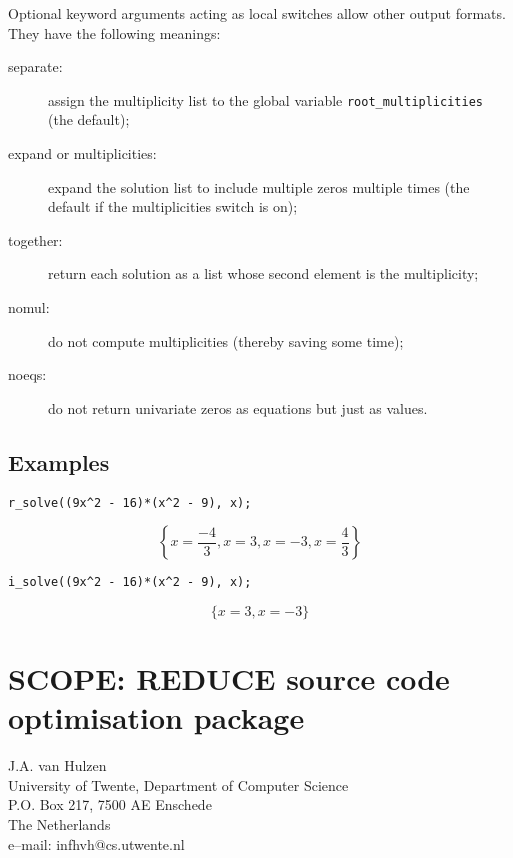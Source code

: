 \documentclass[11pt,letterpaper]{book}
\begin{document}
\begin{sloppypar}
Optional keyword arguments acting as local switches allow other output
formats.  They have the following meanings:
\begin{description}
\item[{\ttfamily separate}:] assign the multiplicity list to the global
  variable \verb|root_multiplicities| (the default);
\item[{\ttfamily expand} or {\ttfamily multiplicities}:] expand the solution
  list to include multiple zeros multiple times (the default if the
  {\ttfamily multiplicities} switch is on);
\item[{\ttfamily together}:] return each solution as a list whose second
  element is the multiplicity;
\item[{\ttfamily nomul}:] do not compute multiplicities (thereby saving
  some time);
\item[{\ttfamily noeqs}:] do not return univariate zeros as equations but
  just as values.
\end{description}
\end{sloppypar}


\section{Examples}

{\small\begin{verbatim}
r_solve((9x^2 - 16)*(x^2 - 9), x);
\end{verbatim}}
\[
  \left\{x=\frac{-4}{3},x=3,x=-3,x=\frac{4}{3}\right\}
\]
{\small\begin{verbatim}
i_solve((9x^2 - 16)*(x^2 - 9), x);
\end{verbatim}}
\[
  \{x=3,x=-3\}
\]

\chapter[SCOPE: Source code optimisation package]
{SCOPE: REDUCE source code optimisation package}
\label{SCOPE}

{\footnotesize
\begin{center}
J.A. van Hulzen \\
University of Twente, Department of Computer Science \\
P.O. Box 217, 7500 AE Enschede \\
The Netherlands \\[0.05in]
e--mail: infhvh@cs.utwente.nl
\end{center}
}
\end{document}
